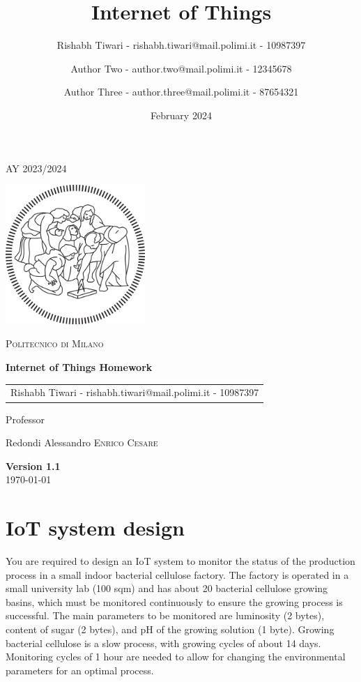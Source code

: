 \documentclass{article}
\title{Internet of Things}
\author{%
Rishabh Tiwari - rishabh.tiwari@mail.polimi.it - 10987397 \and
Author Two - author.two@mail.polimi.it - 12345678 \and
Author Three - author.three@mail.polimi.it - 87654321
}
\date{February 2024}
\begin{document}
\begin{titlepage}
    \centering
    {\scshape\large AY 2023/2024 \par}
    \vfill
    \includegraphics[width=150pt]{Images/PolimiLogo.png}\par\vspace{1cm}
    {\scshape\LARGE Politecnico di Milano \par}
    \vspace{1.5cm}
    {\huge\bfseries Internet of Things Homework\par}
    \vspace{2cm}
    {\Large \begin{tabular}{c}
    Rishabh Tiwari - rishabh.tiwari@mail.polimi.it - 10987397
    \end{tabular}\par}
    \vfill
    {\large Professor\par
        Redondi Alessandro \textsc{Enrico Cesare}}
    \vfill
    {\large \textbf{Version 1.1}\\ \today \par}
\end{titlepage}
\thispagestyle{plain}
\mbox{}
\section{IoT system design}

You are required to design an IoT system to monitor the status of the production process in a small indoor bacterial cellulose factory. The factory is operated in a small university lab (100 sqm) and has about 20 bacterial cellulose growing basins, which must be monitored continuously to ensure the growing process is successful. The main parameters to be monitored are luminosity (2 bytes), content of sugar (2 bytes), and pH of the growing solution (1 byte). Growing bacterial cellulose is a slow process, with growing cycles of about 14 days. Monitoring cycles of 1 hour are needed to allow for changing the environmental parameters for an optimal process.
\end{document}
